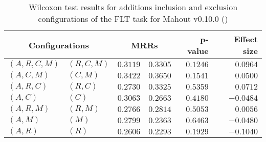 
\begin{table}
\begin{spacing}{1.2}
\centering
\caption{Wilcoxon test results for additions inclusion and exclusion configurations of the FLT task for Mahout v0.10.0 (\ctwo)}
\label{table:versus-wilcox-mahout-flt-additions}
\begin{tabular}{ll|rr|rr}
\toprule
      \multicolumn{2}{c|}{Configurations} &                \multicolumn{2}{c|}{MRRs} &             p-value & Effect size \\
\midrule
 $(A,R,C,M)$ &  $(R,C,M)$ &       $0.3119$ &  $\bm{0.3305}$ & $0.1246$ &    $0.0964$ \\
   $(A,C,M)$ &    $(C,M)$ &       $0.3422$ &  $\bm{0.3650}$ & $0.1541$ &    $0.0500$ \\
   $(A,R,C)$ &    $(R,C)$ &       $0.2730$ &  $\bm{0.3325}$ & $0.5359$ &    $0.0712$ \\
     $(A,C)$ &      $(C)$ &  $\bm{0.3063}$ &       $0.2663$ & $0.4180$ &   $-0.0484$ \\
   $(A,R,M)$ &    $(R,M)$ &       $0.2766$ &  $\bm{0.2814}$ & $0.5053$ &    $0.0056$ \\
     $(A,M)$ &      $(M)$ &  $\bm{0.2799}$ &       $0.2363$ & $0.6463$ &   $-0.0480$ \\
     $(A,R)$ &      $(R)$ &  $\bm{0.2606}$ &       $0.2293$ & $0.1929$ &   $-0.1040$ \\
\bottomrule
\end{tabular}

\end{spacing}
\end{table}

